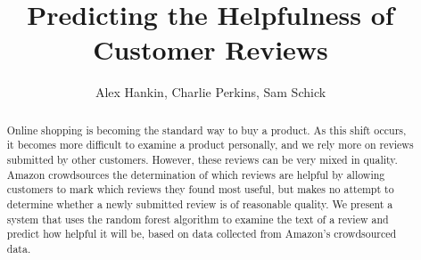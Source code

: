 \documentclass[]{article}
\title{Predicting the Helpfulness of Customer Reviews}
\author{Alex Hankin, Charlie Perkins, Sam Schick}
\date{}
\begin{document}
\maketitle

\begin{abstract}
	Online shopping is becoming the standard way to buy a product. As this shift occurs, it becomes more difficult to examine a product personally, and we rely more on reviews submitted by other customers. However, these reviews can be very mixed in quality. Amazon crowdsources the determination of which reviews are helpful by allowing customers to mark which reviews they found most useful, but makes no attempt to determine whether a newly submitted review is of reasonable quality. We present a system that uses the random forest algorithm to examine the text of a review and predict how helpful it will be, based on data collected from Amazon's crowdsourced data.
\end{abstract}
\end{document}
